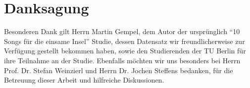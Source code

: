 \section*{Danksagung}
\label{sec:Danksagung}
Besonderen Dank gilt Herrn Martin Gempel, dem Autor der ursprünglich "`10 Songs für die einsame Insel"' Studie, dessen Datensatz wir freundlicherweise zur Verfügung gestellt bekommen haben, sowie den Studierenden der TU Berlin für ihre Teilnahme an der Studie.
Ebenfalls möchten wir uns besonders  bei Herrn Prof. Dr. Stefan Weinzierl und Herrn Dr. Jochen Steffens bedanken, für die Betreuung dieser Arbeit und hilfreiche Diskussionen.